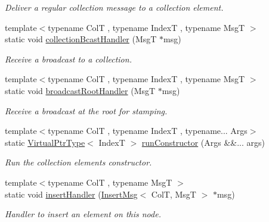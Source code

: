 \begin{DoxyCompactItemize}
\begin{DoxyCompactList}\small\item\em Deliver a regular collection message to a collection element. \end{DoxyCompactList}\item 
{\footnotesize template$<$typename ColT , typename IndexT , typename MsgT $>$ }\\static void \hyperlink{structvt_1_1vrt_1_1collection_1_1_collection_manager_a2a9fcbafc83d78d80c8d5f758e880b47}{collection\+Bcast\+Handler} (MsgT $\ast$msg)
\begin{DoxyCompactList}\small\item\em Receive a broadcast to a collection. \end{DoxyCompactList}\item 
{\footnotesize template$<$typename ColT , typename IndexT , typename MsgT $>$ }\\static void \hyperlink{structvt_1_1vrt_1_1collection_1_1_collection_manager_a9859d8346c9aac1fb0b65e6db82969db}{broadcast\+Root\+Handler} (MsgT $\ast$msg)
\begin{DoxyCompactList}\small\item\em Receive a broadcast at the root for stamping. \end{DoxyCompactList}\item 
{\footnotesize template$<$typename ColT , typename IndexT , typename... Args$>$ }\\static \hyperlink{structvt_1_1vrt_1_1collection_1_1_collection_manager_a086cab4af6af4f869fbf8814c3a9a6a4}{Virtual\+Ptr\+Type}$<$ IndexT $>$ \hyperlink{structvt_1_1vrt_1_1collection_1_1_collection_manager_ad9a0b889d763dd4eae462b9ca6d07cc9}{run\+Constructor} (Args \&\&... args)
\begin{DoxyCompactList}\small\item\em Run the collection element\textquotesingle{}s constructor. \end{DoxyCompactList}\item 
{\footnotesize template$<$typename ColT , typename MsgT $>$ }\\static void \hyperlink{structvt_1_1vrt_1_1collection_1_1_collection_manager_a1c16b833c74649b4cc0e30d622ddaf61}{insert\+Handler} (\hyperlink{structvt_1_1vrt_1_1collection_1_1_insert_msg}{Insert\+Msg}$<$ ColT, MsgT $>$ $\ast$msg)
\begin{DoxyCompactList}\small\item\em Handler to insert an element on this node. \end{DoxyCompactList}\item 

\end{DoxyCompactItemize}

